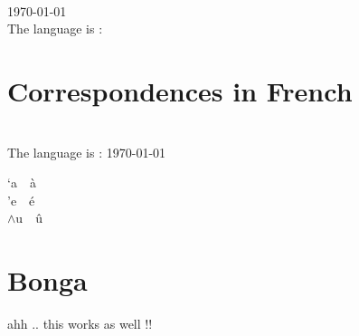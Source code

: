 \documentclass{article}
\begin{document}
\\
\today\\
The language is : 

\section{Correspondences in French}
\\
The language is : 
\today\\
\newcommand{\LS}[1]{`#1~~\`#1}
\newcommand{\RS}[1]{'#1~~\'#1}
\newcommand{\HAT}[1]{$\wedge$#1~~\^#1}

\LS{a}\\
\RS{e}\\
\HAT{u}\\

\appendix

\section{Bonga}
ahh .. this works as well !!

\printindex
\end{document}
